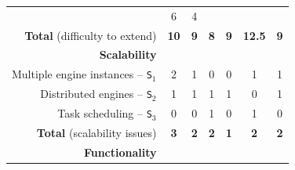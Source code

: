 \documentclass[preprint,3p,twocolumn]{elsarticle}
\newcommand{\correction}[1]{\color{blue}#1\color{black}\xspace}
\begin{document}
\begin{table}
\begin{tabular}{rcccccc}
                                     & \cellcolor[HTML]{999999}6
                                     & \cellcolor[HTML]{99DD99}4\\
  \textbf{Total} (difficulty to extend) & \cellcolor[HTML]{99D299}\textbf{10}
                                     & \cellcolor[HTML]{99D299}\textbf{\correction{9}}
                                     & \cellcolor[HTML]{99FF99}\textbf{8}
                                     & \cellcolor[HTML]{99E899}\textbf{9}
                                     & \cellcolor[HTML]{999999}\textbf{12.5}
                                     & \cellcolor[HTML]{99E899}\textbf{9}\\
\cellcolor[HTML]{EEEEEE}\textbf{Scalability}& \multicolumn{6}{l}{\cellcolor[HTML]{EEEEEE}}\\
Multiple engine instances -- \texttt{S$_1$}& \cellcolor[HTML]{999999}2
                                     & \cellcolor[HTML]{99CC99}1
                                     & \cellcolor[HTML]{99FF99}0
                                     & \cellcolor[HTML]{99FF99}0
                                     & \cellcolor[HTML]{99CC99}1
                                     & \cellcolor[HTML]{99CC99}1\\
Distributed engines -- \texttt{S$_2$}& \cellcolor[HTML]{999999}1
                                     & \cellcolor[HTML]{999999}1
                                     & \cellcolor[HTML]{999999}1
                                     & \cellcolor[HTML]{999999}1
                                     & \cellcolor[HTML]{99FF99}0
                                     & \cellcolor[HTML]{999999}1\\
Task scheduling -- \texttt{S$_3$}    & \cellcolor[HTML]{99FF99}0
                                     & \cellcolor[HTML]{99FF99}0
                                     & \cellcolor[HTML]{999999}1
                                     & \cellcolor[HTML]{99FF99}0
                                     & \cellcolor[HTML]{999999}1
                                     & \cellcolor[HTML]{99FF99}0\\
\textbf{Total} (scalability issues)  & \cellcolor[HTML]{999999}\textbf{3}
                                     & \cellcolor[HTML]{99CC99}\textbf{2}
                                     & \cellcolor[HTML]{99CC99}\textbf{2}
                                     & \cellcolor[HTML]{99FF99}\textbf{1}
                                     & \cellcolor[HTML]{99CC99}\textbf{2}
                                     & \cellcolor[HTML]{99CC99}\textbf{2}\\
\cellcolor[HTML]{EEEEEE}\textbf{\correction{Functionality}}& \multicolumn{6}{l}{\cellcolor[HTML]{EEEEEE}}\\

\end{tabular}
\end{table}
\end{document}
